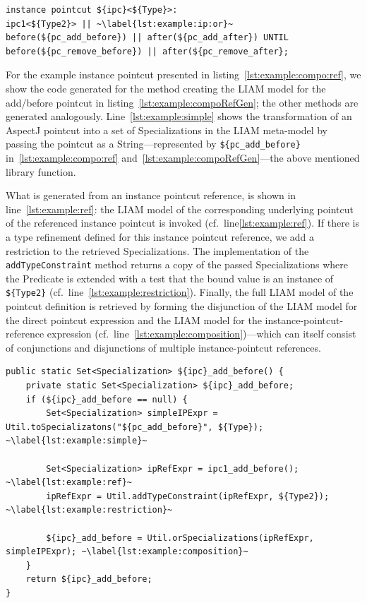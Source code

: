 \documentclass{acm_proc_article-sp}
\begin{document}
\begin{lstlisting}[caption={Example of an instance pointcut using composition and type refinement}, label=lst:example:compo:ref,moreemph=instance]
instance pointcut ${ipc}<${Type}>:
ipc1<${Type2}> || ~\label{lst:example:ip:or}~
before(${pc_add_before}) || after(${pc_add_after}) UNTIL 
before(${pc_remove_before}) || after(${pc_remove_after};
\end{lstlisting}

For the example instance pointcut presented in listing~\ref{lst:example:compo:ref}, we show the code generated for the method creating the LIAM model for the add/before pointcut in listing~\ref{lst:example:compoRefGen}; the other methods are generated analogously.
Line~\ref{lst:example:simple} shows the transformation of an AspectJ pointcut into a set of Specializations in the LIAM meta-model by passing the pointcut as a String---represented by \lstinline!${pc_add_before}! in~\ref{lst:example:compo:ref} and~\ref{lst:example:compoRefGen}---the above mentioned library function.

What is generated from an instance pointcut reference, is shown in line~\ref{lst:example:ref}: the LIAM model of the corresponding underlying pointcut of the referenced instance pointcut is invoked (cf.~line\ref{lst:example:ref}).
If there is a type refinement defined for this instance pointcut reference, we add a restriction to the retrieved Specializations.
The implementation of the \lstinline!addTypeConstraint! method returns a copy of the passed Specializations where the Predicate is extended with a test that the bound value is an instance of \lstinline!${Type2}! (cf.\ line~\ref{lst:example:restriction}).
Finally, the full LIAM model of the pointcut definition is retrieved by forming the disjunction of the LIAM model for the direct pointcut expression and the LIAM model for the instance-pointcut-reference expression (cf.\ line~\ref{lst:example:composition})---which can itself consist of conjunctions and disjunctions of multiple instance-pointcut references.

\begin{lstlisting}[caption={Generated code for creating the LIAM model for the add/before pointcut of the example instance pointcut.},label={lst:example:compoRefGen}]
public static Set<Specialization> ${ipc}_add_before() {
	private static Set<Specialization> ${ipc}_add_before;
	if (${ipc}_add_before == null) {
		Set<Specialization> simpleIPExpr = Util.toSpecializatons("${pc_add_before}", ${Type}); ~\label{lst:example:simple}~
		
		Set<Specialization> ipRefExpr = ipc1_add_before(); ~\label{lst:example:ref}~
		ipRefExpr = Util.addTypeConstraint(ipRefExpr, ${Type2}); ~\label{lst:example:restriction}~
		
		${ipc}_add_before = Util.orSpecializations(ipRefExpr, simpleIPExpr); ~\label{lst:example:composition}~
	}
	return ${ipc}_add_before;
}
\end{lstlisting}
\end{document}
